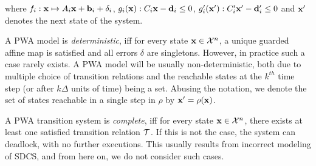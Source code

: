 where $f_i:\mathbf{x} \mapsto A_i\mathbf{x} + \mathbf{b}_i + \delta_i$,
$g_i(\mathbf{x}):C_i\mathbf{x}-\mathbf{d}_i\le0$, $g'_i(\mathbf{x}'):C'_i\mathbf{x}'-\mathbf{d}'_i\le0$ and $\mathbf{x}'$
denotes the next state of the system.

A PWA model is \textit{deterministic}, iff for every state
$\mathbf{x}\in\mathcal{X}^n$, a unique guarded affine map is satisfied and
all errors $\delta$ are singletons. However, in practice such a case
rarely exists. A PWA model will be usually non-deterministic, both due
to multiple choice of transition relations and the reachable states at
the $k^{th}$ time step (or after $k\Delta$ units of time) being a set.
Abusing the notation, we denote the set of states reachable in a
single step in $\rho$ by $\mathbf{x}' = \rho(\mathbf{x})$.

A PWA transition system is \textit{complete}, iff for every state
$\mathbf{x}\in\mathcal{X}^n$, there exists at least one satisfied
transition relation $\mathcal{T}$. If this is not the case, the system can
deadlock, with no further executions. This usually results from
incorrect modeling of SDCS, and from here on, we do not consider such
cases.






